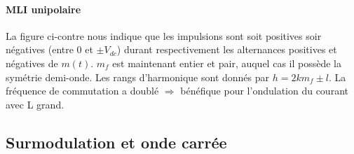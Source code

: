 			\paragraph{MLI unipolaire} \quad La figure ci-contre nous indique que les impulsions sont soit positives soir négatives (entre 0 et $\pm V_{dc}$) durant respectivement les alternances positives et négatives de $m(t)$. $m_f$ est maintenant entier et pair, auquel cas il possède la symétrie demi-onde. Les rangs d'harmonique sont donnés par $h=2km_f \pm l$. La fréquence de commutation a doublé $\Rightarrow$ bénéfique pour l'ondulation du courant avec L grand. 
			
	\subsection{Surmodulation et onde carrée}

